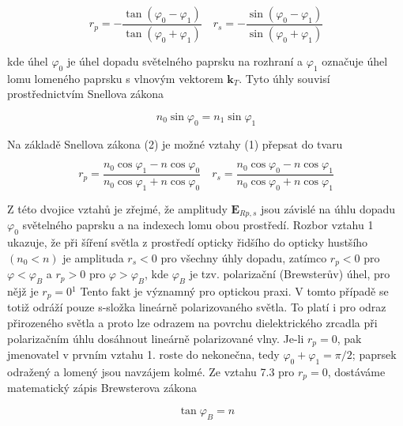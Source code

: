 \documentclass[czech,11pt,a4paper]{article}
\begin{document}
\begin{multicols}{2}
		\begin{equation}
			r_{p}=-\frac{\tan \left(\varphi_{0}-\varphi_{1}\right)}{\tan \left(\varphi_{0}+\varphi_{1}\right)} \quad r_{s}=-\frac{\sin \left(\varphi_{0}-\varphi_{1}\right)}{\sin \left(\varphi_{0}+\varphi_{1}\right)}
		\end{equation}
		
		
		kde úhel $\varphi_{0}$ je úhel dopadu světelného paprsku na rozhraní a $\varphi_{1}$ označuje úhel lomu lomeného paprsku s vlnovým vektorem $\boldsymbol{k}_{T}$. Tyto úhly souvisí prostřednictvím Snellova zákona
		
		\begin{equation}
			n_{0} \sin \varphi_{0}=n_{1} \sin \varphi_{1}
		\end{equation}
		
		
		Na základě Snellova zákona (2) je možné vztahy (1) přepsat do tvaru
		
		
		\begin{equation}
			r_{p}=\frac{n_{0} \cos \varphi_{1}-n \cos \varphi_{0}}{n_{0} \cos \varphi_{1}+n \cos \varphi_{0}} \quad r_{s}=\frac{n_{0} \cos \varphi_{0}-n \cos \varphi_{1}}{n_{0} \cos \varphi_{0}+n \cos \varphi_{1}}
		\end{equation}
		
		Z této dvojice vztahů je zřejmé, že amplitudy $\boldsymbol{E}_{R p, s}$ jsou závislé na úhlu dopadu $\varphi_{0}$ světelného paprsku a na indexech lomu obou prostředí. Rozbor vztahu 1 ukazuje, že při šíření světla z prostředí opticky řidšího do opticky hustšího $\left(n_{0}<n\right)$ je amplituda $r_{s}<0$ pro všechny úhly dopadu, zatímco $r_{p}<0$ pro $\varphi<\varphi_{B}$ a $r_{p}>0$ pro $\varphi>\varphi_{B}$, kde $\varphi_{B}$ je tzv. polarizační (Brewsterův) úhel, pro nějž je $r_{p}=0{ }^{1}$ Tento fakt je významný pro optickou praxi. V tomto případě se totiž odráží pouze s-složka lineárně polarizovaného světla. To platí i pro odraz přirozeného světla a proto lze odrazem na povrchu dielektrického zrcadla při polarizačním úhlu dosáhnout lineárně polarizované vlny. Je-li $r_{p}=0$, pak jmenovatel v prvním vztahu 1. roste do nekonečna, tedy $\varphi_{0}+\varphi_{1}=\pi / 2$; paprsek odražený a lomený jsou navzájem kolmé. Ze vztahu 7.3 pro $r_{p}=0$, dostáváme matematický zápis Brewsterova zákona
		
		\begin{equation}
			\tan \varphi_{B}=n
		\end{equation}
		

\end{multicols}
\end{document}
